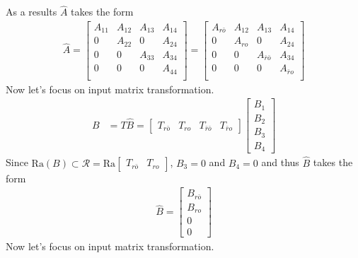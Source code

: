 \documentclass[twoside]{article}
\begin{document}
As a results $\hat{A}$ takes the form
%
\begin{align*}
    \hat{A} = 
    \left[ \begin{array}{c|c|c|c} A_{11} & A_{12} & A_{13} & A_{14} \\ \hline 
    0 & A_{22} & 0 & A_{24} \\ \hline 
    0 & 0 & A_{33} & A_{34} \\ \hline 
    0 & 0 & 0 & A_{44} \\ 
    \end{array} \right] = 
    \left[ \begin{array}{c|c|c|c} A_{r\bar{o}} & A_{12} & A_{13} & A_{14} \\ \hline 
    0 & A_{ro} & 0 & A_{24} \\ \hline 
    0 & 0 & A_{\bar{r}\bar{o}} & A_{34} \\ \hline 
    0 & 0 & 0 & A_{\bar{r}o} \\ 
    \end{array} \right]
\end{align*}
%
Now let's focus on input matrix transformation.
%
\begin{align*}
    B &= T \hat{B} = \left[ \begin{array}{c|c|c|c} T_{r\bar{o}} & T_{ro} & T_{\bar{r} \bar{o}} & T_{\bar{r} o} \end{array} \right] \left[ \begin{array}{c} B_1 \\ B_2 \\ B_3 \\ B_4 \end{array} \right]
\end{align*}
%
Since $\mathrm{Ra}(B) \subset \mathcal{R} =\mathrm{Ra}\left[ \begin{array}{c|c} T_{r\bar{o}} & T_{ro} \end{array} \right]$, $B_3 = 0$
and $B_4 = 0$ and thus $\hat{B}$ takes the form
\begin{align*}
    \hat{B} = \left[ \begin{array}{c} B_{r\bar{o}} \\ B_{ro} \\ 0 \\ 0 \end{array} \right]
\end{align*}
%
Now let's focus on input matrix transformation.
%
\end{document}
